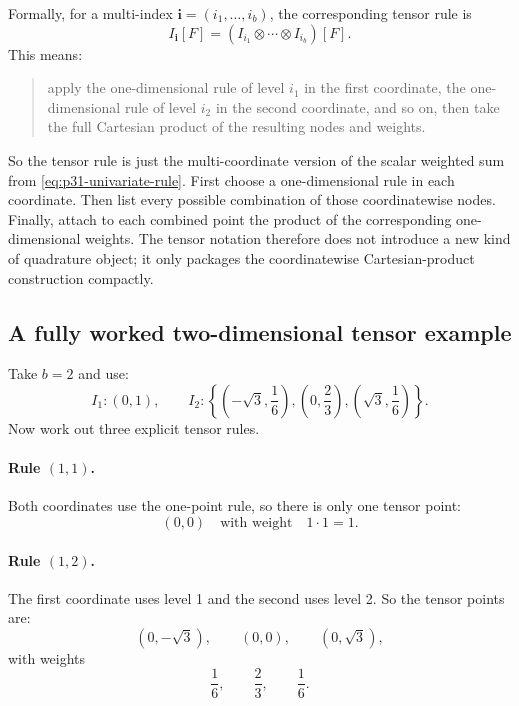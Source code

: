 \documentclass[11pt]{article}
\numberwithin{equation}{section}
\begin{document}
Formally, for a multi-index \(\mathbf i=(i_1,\ldots,i_b)\), the corresponding
tensor rule is
\begin{equation}
  I_{\mathbf i}[F]
  =
  (I_{i_1}\otimes\cdots\otimes I_{i_b})[F].
  \label{eq:p31-tensor-rule}
\end{equation}
This means:
\begin{quote}
apply the one-dimensional rule of level \(i_1\) in the first coordinate, the
one-dimensional rule of level \(i_2\) in the second coordinate, and so on, then
take the full Cartesian product of the resulting nodes and weights.
\end{quote}
So the tensor rule is just the multi-coordinate version of the scalar weighted
sum from \eqref{eq:p31-univariate-rule}.  First choose a one-dimensional rule in
each coordinate.  Then list every possible combination of those coordinatewise
nodes.  Finally, attach to each combined point the product of the corresponding
one-dimensional weights.  The tensor notation therefore does not introduce a new
kind of quadrature object; it only packages the coordinatewise Cartesian-product
construction compactly.

\subsection{A fully worked two-dimensional tensor example}

Take \(b=2\) and use:
\begin{equation}
  I_1:(0,1),
  \qquad
  I_2:\left\{\left(-\sqrt3,\frac16\right),\left(0,\frac23\right),
  \left(\sqrt3,\frac16\right)\right\}.
  \label{eq:p36-level1-level2-rules}
\end{equation}
Now work out three explicit tensor rules.

\paragraph{Rule \texorpdfstring{\((1,1)\)}{(1,1)}.}
Both coordinates use the one-point rule, so there is only one tensor point:
\begin{equation}
  (0,0)
  \quad\text{with weight}\quad 1\cdot 1 = 1.
  \label{eq:p36-rule-11}
\end{equation}

\paragraph{Rule \texorpdfstring{\((1,2)\)}{(1,2)}.}
The first coordinate uses level 1 and the second uses level 2.  So the tensor
points are:
\begin{equation}
  (0,-\sqrt3),\qquad (0,0),\qquad (0,\sqrt3),
  \label{eq:p36-rule-12-points}
\end{equation}
with weights
\begin{equation}
  \frac16,\qquad \frac23,\qquad \frac16.
  \label{eq:p36-rule-12-weights}
\end{equation}
\end{document}
